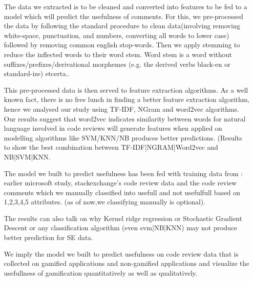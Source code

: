 \documentclass[conference]{IEEEtran}
\begin{document}
The data we extracted is to be cleaned and converted into features to be fed to a model which will predict the usefulness of comments. For this, we pre-processed the data by following the standard procedure to clean data(involving removing white-space, punctuation, and numbers, converting
all words to lower case) followed by removing common english stop-words. Then we apply stemming\cite{porter stemming} to reduce the inflected words to their word stem. Word stem is a word without suffixes/prefixes/derivational morphemes (e.g. the derived verbs black-en or standard-ize) etcerta..

This pre-processed data is then served to feature extraction algorithms. As a well known fact, there is no free lunch in finding a better feature extraction algorithm, hence we analysed our study using  TF-IDF, NGram and word2vec algorithms. Our results suggest that word2vec indicates similarity between words for natural language involved in code reviews will generate features when applied on modelling algorithms like SVM/KNN/NB produces better predictions. (Results to show the best combination between TF-IDF|NGRAM|Word2vec and NB|SVM|KNN.

The model we built to predict usefulness has been fed with training data from : earlier microsoft study\cite{p146-bosu paper}, stackexchange's code review data and the code review comments which we manually classified into usefull and not usefulfull based on 1,2,3,4,5 attributes. (as of now,we classifying manually is optional).

The results can also talk on why Kernel ridge regression or Stochastic Gradient Descent or any classification algorithm (even svm|NB|KNN) may not produce better prediction for SE data.

We imply the model we built to predict usefulness on code review data that is collected on gamified applications and non-gamified applications and visualize the usefullness of gamification quantitatively as well as qualitatively.
\end{document}
